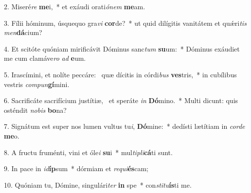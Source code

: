 2. Miseré\textit{re} \textbf{me}i,~*  et exáudi orati\textit{ó}\textit{nem} \textbf{me}am.\

3. Fílii hóminum, úsquequo gra\textit{vi} \textbf{cor}de?~*  ut quid dilígitis vanitátem et quǽri\textit{tis} \textit{men}\textbf{dá}cium?\

4. Et scitóte quóniam mirificávit Dóminus sanc\textit{tum} \textbf{su}um:~*  Dóminus exáudiet me cum clamáve\textit{ro} \textit{ad} \textbf{e}um.\

5. Irascímini, et nolíte peccáre: \dag\  quæ dícitis in córdi\textit{bus} \textbf{ves}tris,~*  in cubílibus vestris \textit{com}\textit{pun}\textbf{gí}mini.\

6. Sacrificáte sacrifícium justítiæ, \dag\  et speráte \textit{in} \textbf{Dó}mino.~*  Multi dicunt: quis osténdit \textit{no}\textit{bis} \textbf{bo}na?\

7. Signátum est super nos lumen vultus tu\textit{i}, \textbf{Dó}mine:~*  dedísti lætítiam in \textit{cor}\textit{de} \textbf{me}o.\

8. A fructu fruménti, vini et óle\textit{i} \textbf{su}i~*  mul\textit{ti}\textit{pli}\textbf{cá}ti sunt.\

9. In pace in \textit{id}\textbf{íp}sum~*  dórmiam et \textit{re}\textit{qui}\textbf{és}cam;\

10. Quóniam tu, Dómine, singulári\textit{ter} \textbf{in} spe~*  con\textit{sti}\textit{tu}\textbf{ís}ti me.\

